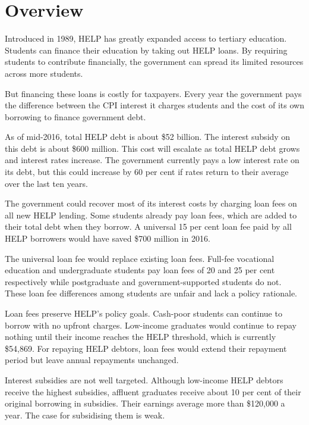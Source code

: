 \documentclass[]{book}
\begin{document}
\chapter{\texorpdfstring{\protect\hypertarget{_Ref309722959}{}{\protect\hypertarget{_Toc341784479}{}{}}Overview}{Overview}}\label{overview}

Introduced in 1989, HELP has greatly expanded access to tertiary education. Students can finance their education by taking out HELP loans. By requiring students to contribute financially, the government can spread its limited resources across more students.

But financing these loans is costly for taxpayers. Every year the government pays the difference between the CPI interest it charges students and the cost of its own borrowing to finance government debt.

As of mid-2016, total HELP debt is about \$52 billion. The interest subsidy on this debt is about \$600 million. This cost will escalate as total HELP debt grows and interest rates increase. The government currently pays a low interest rate on its debt, but this could increase by 60 per cent if rates return to their average over the last ten years.

The government could recover most of its interest costs by charging loan fees on all new HELP lending. Some students already pay loan fees, which are added to their total debt when they borrow. A universal 15 per cent loan fee paid by all HELP borrowers would have saved \$700 million in 2016.

The universal loan fee would replace existing loan fees. Full-fee vocational education and undergraduate students pay loan fees of 20 and 25 per cent respectively while postgraduate and government-supported students do not. These loan fee differences among students are unfair and lack a policy rationale.

Loan fees preserve HELP's policy goals. Cash-poor students can continue to borrow with no upfront charges. Low-income graduates would continue to repay nothing until their income reaches the HELP threshold, which is currently \$54,869. For repaying HELP debtors, loan fees would extend their repayment period but leave annual repayments unchanged.

Interest subsidies are not well targeted. Although low-income HELP debtors receive the highest subsidies, affluent graduates receive about 10 per cent of their original borrowing in subsidies. Their earnings average more than \$120,000 a year. The case for subsidising them is weak.
\end{document}
